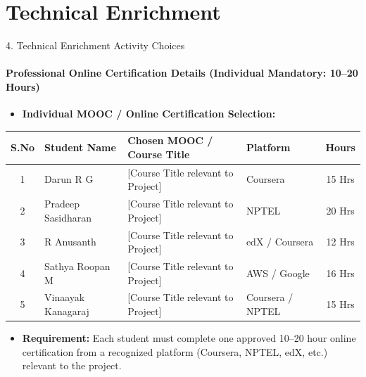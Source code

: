 \documentclass[aspectratio=169, 11pt]{beamer}
\begin{document}
\section{Technical Enrichment}
\begin{frame}{4. Technical Enrichment Activity Choices}
    \framesubtitle{Professional Online Certification Details (Individual Mandatory: 10--20 Hours)}
    \begin{itemize}
        \item \textbf{Individual MOOC / Online Certification Selection:}
    \end{itemize}
    \vspace{-0.1cm}
    \begin{table}
        \centering
        \footnotesize
        \renewcommand{\arraystretch}{1.15}
        \begin{tabular}{|c|p{2.8cm}|p{5.0cm}|p{2.3cm}|c|}
            \hline
            \textbf{S.No} & \textbf{Student Name} & \textbf{Chosen MOOC / Course Title} & \textbf{Platform} & \textbf{Hours} \\
            \hline
            1 & Darun R G & [Course Title relevant to Project] & Coursera & 15 Hrs \\
            \hline
            2 & Pradeep Sasidharan & [Course Title relevant to Project] & NPTEL & 20 Hrs \\
            \hline
            3 & R Anusanth & [Course Title relevant to Project] & edX / Coursera & 12 Hrs \\
            \hline
            4 & Sathya Roopan M & [Course Title relevant to Project] & AWS / Google & 16 Hrs \\
            \hline
            5 & Vinaayak Kanagaraj & [Course Title relevant to Project] & Coursera / NPTEL & 15 Hrs \\
            \hline
        \end{tabular}
    \end{table}
    \vspace{0.15cm}
    \begin{itemize}
        \item {\scriptsize \textbf{Requirement:} Each student must complete one approved 10--20 hour online certification from a recognized platform (Coursera, NPTEL, edX, etc.) relevant to the project.}
    \end{itemize}
\end{frame}
\end{document}
